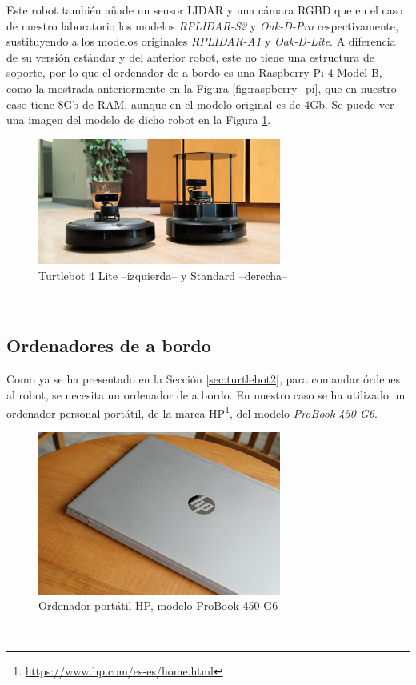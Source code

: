 Este robot también añade un sensor LIDAR y una cámara RGBD que en el caso de
nuestro laboratorio los modelos \textit{RPLIDAR-S2} y \textit{Oak-D-Pro}
respectivamente, sustituyendo a los modelos originales \textit{RPLIDAR-A1} y
\textit{Oak-D-Lite}.
A diferencia de su versión estándar y del anterior robot, este no tiene una
estructura de soporte, por lo que el ordenador de a bordo es una Raspberry
Pi 4 Model B, como la mostrada anteriormente en la Figura
\ref{fig:raspberry_pi}, que en nuestro caso tiene 8Gb de RAM, aunque en el
modelo original es de 4Gb.
Se puede ver una imagen del modelo de dicho robot en la Figura
\ref{fig:turtlebot4}.

\begin{figure} [h!]
  \begin{center}
    \includegraphics[width=8cm]{figs/turtlebot4}
  \end{center}
  \caption{Turtlebot 4 Lite --izquierda-- y Standard --derecha-- \citep{turtlebot4}}
  \label{fig:turtlebot4}
\end{figure}\


\subsection{Ordenadores de a bordo}
\label{sec:a_bordo}

Como ya se ha presentado en la Sección \ref{sec:turtlebot2}, para comandar
órdenes al robot, se necesita un ordenador de a bordo.
En nuestro caso se ha utilizado un ordenador personal portátil, de la marca
HP\footnote{\url{https://www.hp.com/es-es/home.html}}, del modelo
\textit{ProBook 450 G6}.

\begin{figure} [h!]
  \begin{center}
    \includegraphics[width=8cm]{figs/hp_probook}
  \end{center}
  \caption{Ordenador portátil HP, modelo ProBook 450 G6 \citep{hp_probook}}
  \label{fig:hp_probook}
\end{figure}\

